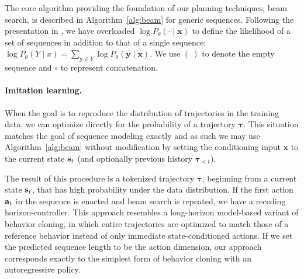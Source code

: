 The core algorithm providing the foundation of our planning techniques, beam search, is described in Algorithm~\ref{alg:beam} for generic sequences.
Following the presentation in \cite{meister2020beam}, we have overloaded $\log P_\theta(\cdot \mid \mathbf{x})$ to define the likelihood of a set of sequences in addition to that of a single sequence: $\log P_\theta(Y \mid x) = \sum_{\mathbf{y} \in Y} \log P_\theta (\mathbf{y} \mid \mathbf{x})$.
We use $(~)$ to denote the empty sequence and $\circ$ to represent concatenation.

\paragraph{Imitation learning.}
When the goal is to reproduce the distribution of trajectories in the training data, we can optimize directly for the probability of a trajectory $\bm{\tau}$.
This situation matches the goal of sequence modeling exactly and as such we may use Algorithm~\ref{alg:beam} without modification by setting the conditioning input $\mathbf{x}$ to the current state $\mathbf{s}_t$ (and optionally previous history $\bm{\tau}_{<t}$).

The result of this procedure is a tokenized trajectory $\bm{\tau}$, beginning from a current state $\mathbf{s}_t$, that has high probability under the data distribution.
If the first action $\mathbf{a}_t$ in the sequence is enacted and beam search is repeated, we have a receding horizon-controller.
This approach resembles a long-horizon model-based variant of behavior cloning, in which entire trajectories are optimized to match those of a reference behavior instead of only immediate state-conditioned actions.
If we set the predicted sequence length to be the action dimension, our approach corresponds exactly to the simplest form of behavior cloning with an autoregressive policy.

